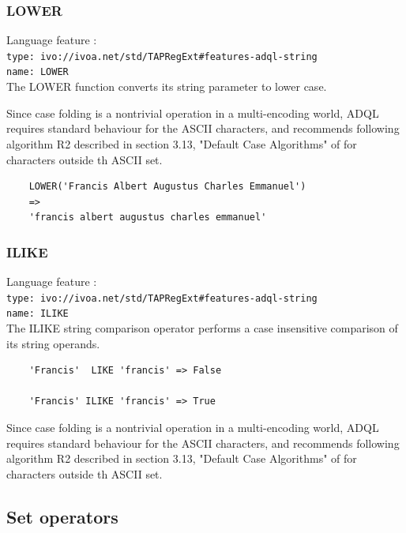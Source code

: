 \documentclass[11pt,a4paper]{ivoa}
\begin{document}
\subsubsection{LOWER}
\label{sec:string.functions.lower}
{\footnotesize Language feature :}\\
{\footnotesize \verb|type: ivo://ivoa.net/std/TAPRegExt#features-adql-string|}\\
{\footnotesize \verb|name: LOWER|}\\

The LOWER function converts its string parameter to lower case.

Since case folding is a nontrivial operation in a multi-encoding world,
ADQL requires standard behaviour for the ASCII characters, and recommends
following algorithm R2 described in section 3.13, "Default Case Algorithms"
of \citet{std:UNICODE} for characters outside th ASCII set.

\begin{verbatim}
    LOWER('Francis Albert Augustus Charles Emmanuel')
    =>
    'francis albert augustus charles emmanuel'
\end{verbatim}

\subsubsection{ILIKE}
\label{sec:string.functions.ilike}
{\footnotesize Language feature :}\\
{\footnotesize \verb|type: ivo://ivoa.net/std/TAPRegExt#features-adql-string|}\\
{\footnotesize \verb|name: ILIKE|}\\

The ILIKE string comparison operator performs a case insensitive comparison
of its string operands.

\begin{verbatim}
    'Francis'  LIKE 'francis' => False

    'Francis' ILIKE 'francis' => True
\end{verbatim}

Since case folding is a nontrivial operation in a multi-encoding world,
ADQL requires standard behaviour for the ASCII characters, and recommends
following algorithm R2 described in section 3.13, "Default Case Algorithms"
of \citet{std:UNICODE} for characters outside th ASCII set.

\subsection{Set operators}
\label{sec:set.operators}
\end{document}
